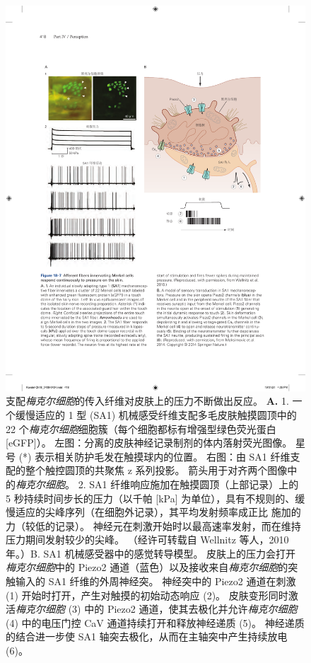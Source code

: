\begin{figure}[htbp]
	\centering
	\includegraphics[width=1.0\linewidth]{chap18/fig_18_7}
	\caption{支配\textit{梅克尔细胞}的传入纤维对皮肤上的压力不断做出反应。
		\textbf{A.} 1. 一个缓慢适应的 1 型 (SA1) 机械感受纤维支配多毛皮肤触摸圆顶中的 22 个\textit{梅克尔细胞}细胞簇（每个细胞都标有增强型绿色荧光蛋白 [eGFP]）。
		左图：分离的皮肤神经记录制剂的体内落射荧光图像。
		星号 (*) 表示相关防护毛发在触摸球内的位置。
		右图：由 SA1 纤维支配的整个触控圆顶的共聚焦 z 系列投影。
		箭头用于对齐两个图像中的\textit{梅克尔细胞}。
		2. SA1 纤维响应施加在触摸圆顶（上部记录）上的 5 秒持续时间步长的压力（以千帕 [kPa] 为单位），具有不规则的、缓慢适应的尖峰序列（在细胞外记录），其平均发射频率成正比 施加的力（较低的记录）。
		神经元在刺激开始时以最高速率发射，而在维持压力期间发射较少的尖峰。 （经许可转载自 Wellnitz 等人，2010 年。）B. SA1 机械感受器中的感觉转导模型。
		皮肤上的压力会打开\textit{梅克尔细胞}中的 Piezo2 通道（蓝色）以及接收来自\textit{梅克尔细胞}的突触输入的 SA1 纤维的外周神经突。
		神经突中的 Piezo2 通道在刺激 (1) 开始时打开，产生对触摸的初始动态响应 (2)。
		皮肤变形同时激活\textit{梅克尔细胞} (3) 中的 Piezo2 通道，使其去极化并允许\textit{梅克尔细胞} (4) 中的电压门控 CaV 通道持续打开和释放神经递质 (5)。
		神经递质的结合进一步使 SA1 轴突去极化，从而在主轴突中产生持续放电 (6)\cite{maksimovic2014epidermal}。}
	\label{fig:18_7}
\end{figure}


